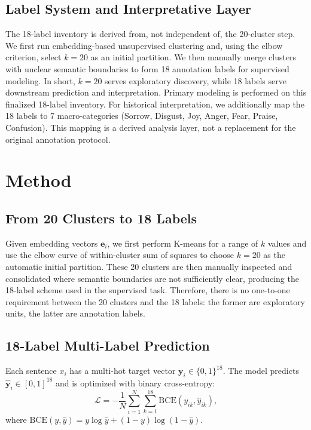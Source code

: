 \documentclass[11pt]{article}
\begin{document}
\subsection{Label System and Interpretative Layer}

The 18-label inventory is derived from, not independent of, the 20-cluster step.
We first run embedding-based unsupervised clustering and, using the elbow criterion, select \(k=20\) as an initial partition.
We then manually merge clusters with unclear semantic boundaries to form 18 annotation labels for supervised modeling.
In short, \(k=20\) serves exploratory discovery, while 18 labels serve downstream prediction and interpretation.
Primary modeling is performed on this finalized 18-label inventory.
For historical interpretation, we additionally map the 18 labels to 7 macro-categories (Sorrow, Disgust, Joy, Anger, Fear, Praise, Confusion).
This mapping is a derived analysis layer, not a replacement for the original annotation protocol.

\section{Method}

\subsection{From 20 Clusters to 18 Labels}

Given embedding vectors \(\mathbf{e}_i\), we first perform K-means for a range of \(k\) values and use the elbow curve of within-cluster sum of squares to choose \(k=20\) as the automatic initial partition.
These 20 clusters are then manually inspected and consolidated where semantic boundaries are not sufficiently clear, producing the 18-label scheme used in the supervised task.
Therefore, there is no one-to-one requirement between the 20 clusters and the 18 labels:
the former are exploratory units, the latter are annotation labels.

\subsection{18-Label Multi-Label Prediction}

Each sentence \(x_i\) has a multi-hot target vector \(\mathbf{y}_i \in \{0,1\}^{18}\).
The model predicts \(\hat{\mathbf{y}}_i\in[0,1]^{18}\) and is optimized with binary cross-entropy:
\begin{equation}
\mathcal{L} =
-\frac{1}{N}\sum_{i=1}^{N}\sum_{k=1}^{18}
\mathrm{BCE}(y_{ik},\hat{y}_{ik}),
\label{eq:bce}
\end{equation}
where
\(\mathrm{BCE}(y,\hat y)=y\log\hat y+(1-y)\log(1-\hat y)\).
\end{document}
